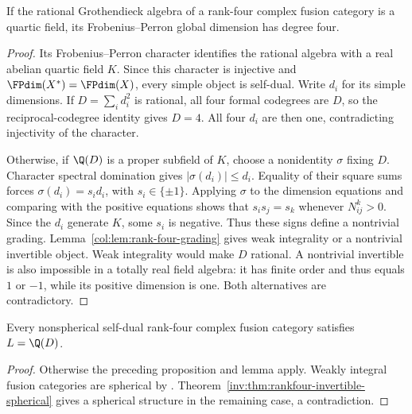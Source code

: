 \begin{corollary}\label{col:cor:quartic-order-casimir-degree}
If the rational Grothendieck algebra of a rank-four complex fusion
category is a quartic field, its Frobenius--Perron global dimension
has degree four.
\end{corollary}
\begin{proof}
Its Frobenius--Perron character identifies the rational algebra with
a real abelian quartic field $K$. Since this character is injective
and $\FPdim(X^*)=\FPdim(X)$, every simple object is self-dual.
Write $d_i$ for its simple
dimensions. If $D=\sum_i d_i^2$ is rational, all four formal codegrees
are $D$, so the reciprocal-codegree identity gives $D=4$. All four
$d_i$ are then one, contradicting injectivity of the character.

Otherwise, if $\Q(D)$ is a proper subfield of $K$, choose a
nonidentity $\sigma$ fixing $D$. Character spectral domination gives
$|\sigma(d_i)|\le d_i$. Equality of their square sums forces
$\sigma(d_i)=s_i d_i$, with $s_i\in\{\pm1\}$. Applying $\sigma$
to the dimension equations and comparing with the positive equations
shows that $s_i s_j=s_k$ whenever $N_{ij}^k>0$. Since the $d_i$
generate $K$, some $s_i$ is negative. Thus these signs define a
nontrivial grading. Lemma~\ref{col:lem:rank-four-grading} gives weak
integrality or a nontrivial invertible object. Weak integrality would
make $D$ rational. A nontrivial invertible is also impossible in a
totally real field algebra: it has finite order and thus equals
$1$ or $-1$, while its positive dimension is one. Both alternatives
are contradictory.
\end{proof}

\begin{corollary}\label{col:cor:rank-four-dimension-field-descent}
Every nonspherical self-dual rank-four complex fusion category
satisfies $L=\Q(D)$.
\end{corollary}
\begin{proof}
Otherwise the preceding proposition and lemma apply. Weakly integral
fusion categories are spherical by \cite[Proposition~8.24]{ENO}.
Theorem~\ref{inv:thm:rankfour-invertible-spherical} gives a spherical
structure in the remaining case, a contradiction.
\end{proof}

